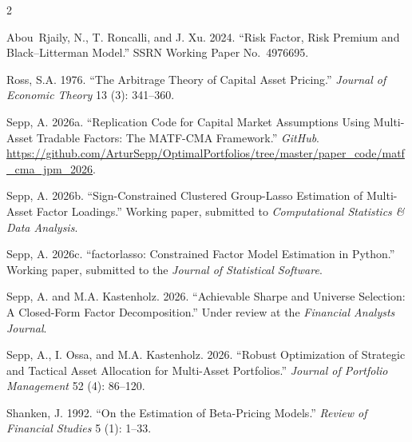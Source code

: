 \documentclass[pdftex,12pt,a4paper]{article}
\begin{document}
\begin{multicols}{2}
\begin{thebibliography}{}
	Abou~Rjaily, N., T. Roncalli, and J. Xu. 2024. ``Risk Factor, Risk Premium and Black--Litterman Model.'' SSRN Working Paper No.~4976695.

	Ross, S.A. 1976. ``The Arbitrage Theory of Capital Asset Pricing.'' \textit{Journal of Economic Theory} 13 (3): 341--360.

	Sepp, A. 2026a. ``Replication Code for Capital Market Assumptions Using Multi-Asset Tradable Factors: The MATF-CMA Framework.'' \textit{GitHub}. \url{https://github.com/ArturSepp/OptimalPortfolios/tree/master/paper_code/matf_cma_jpm_2026}.

	Sepp, A. 2026b. ``Sign-Constrained Clustered Group-Lasso Estimation of Multi-Asset Factor Loadings.'' Working paper, submitted to \textit{Computational Statistics \& Data Analysis}.

	Sepp, A. 2026c. ``factorlasso: Constrained Factor Model Estimation in Python.'' Working paper, submitted to the \textit{Journal of Statistical Software}.

	Sepp, A. and M.A. Kastenholz. 2026. ``Achievable Sharpe and Universe Selection: A Closed-Form Factor Decomposition.'' Under review at the \textit{Financial Analysts Journal}.

	Sepp, A., I. Ossa, and M.A. Kastenholz. 2026. ``Robust Optimization of Strategic and Tactical Asset Allocation for Multi-Asset Portfolios.'' \textit{Journal of Portfolio Management} 52 (4): 86--120.

	Shanken, J. 1992. ``On the Estimation of Beta-Pricing Models.'' \textit{Review of Financial Studies} 5 (1): 1--33.

\end{thebibliography}
\end{multicols}
\end{document}
